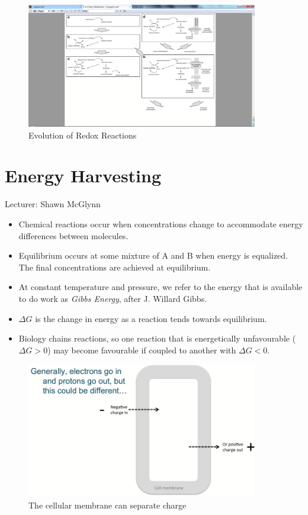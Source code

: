 \documentclass[]{article}
\begin{document}
\begin{figure}[H]
	\caption{Evolution of Redox Reactions} \label{fig:PrimordialRedox2} 
	\includegraphics[width=0.9\textwidth]{PrimordialRedox2}
\end{figure}

\section{Energy Harvesting}

Lecturer: Shawn McGlynn

\begin{itemize}
	\item Chemical reactions occur when concentrations change to accommodate energy differences between molecules.
	
	\item Equilibrium occurs at some mixture of A and B when energy is equalized. The final concentrations are achieved at equilibrium.
	
	\item At constant temperature and 	pressure, we refer 	to the energy that is available to do work as \textit{Gibbs Energy}, after J. Willard Gibbs.
	
	\item $\Delta G$ is the change in energy as a reaction tends towards equilibrium.
	
	\item Biology chains reactions, so one reaction that is energetically unfavourable ( $\Delta G > 0$) may become favourable if coupled to another with  $\Delta G < 0$. 
\end{itemize}


\begin{figure}[H]
	\caption{The cellular membrane 	can separate charge} \label{fig:EnergyHarvesting1} 
	\includegraphics[width=0.9\textwidth]{EnergyHarvesting1}
\end{figure}
\end{document}
